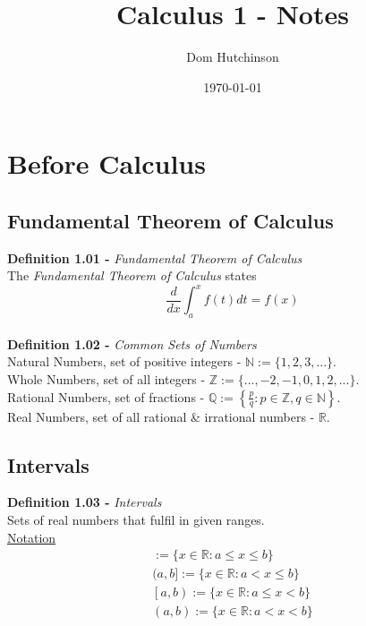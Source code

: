 \documentclass[11pt,a4paper]{article}
\begin{document}
\pagestyle{fancy}
\allowdisplaybreaks

\renewcommand{\headrulewidth}{0pt}
\newcommand{\vect}[1]{\boldsymbol{#1}}
\newcommand{\subtitle}[2]{\textbf{#1}\textit{#2} \\}
\newcommand{\dotprod}[0]{\boldsymbol{\cdot}}
\newcommand{\real}[0]{\mathbb{R}}
\newcommand{\nat}[0]{\mathbb{N}}
\newcommand{\field}[0]{\mathbb{F}}

\setlength\parindent{0pt}

\title{Calculus 1 - Notes}
\author{Dom Hutchinson}
\date{\today}
\maketitle

\fancyhead[R]{\today}

\tableofcontents

\newpage

\section{Before Calculus}

\subsection{Fundamental Theorem of Calculus}
\subtitle{Definition 1.01 - }{Fundamental Theorem of Calculus}
The \textit{Fundamental Theorem of Calculus} states $$\frac{d}{dx}\int_{a}^{x} f(t) dt = f(x) $$ \\

\subtitle{Definition 1.02 - }{Common Sets of Numbers}
Natural Numbers, set of positive integers - $\nat := \{1, 2, 3, ...\}$. \\
Whole Numbers, set of all integers - $\mathbb{Z} := \{..., -2, -1, 0, 1, 2, ...\}$. \\
Rational Numbers, set of fractions - $\mathbb{Q} := \left\{\frac{p}{q} : p \in \mathbb{Z}, q \in \nat \right\}$. \\
Real Numbers, set of all rational \& irrational numbers - $\real$.

\subsection{Intervals}
\subtitle{Definition 1.03 - }{Intervals}
Sets of real numbers that fulfil in given ranges. \\
\underline{Notation}
\begin{eqnarray*}
  [a,b] := \{x \in \real : a \leq x \leq b\} \\
  (a,b] := \{x \in \real : a < x \leq b\} \\
  \left[a,b\right) := \{x \in \real : a \leq x < b\} \\
  (a,b) := \{x \in \real : a < x < b \}
\end{eqnarray*}
\end{document}
